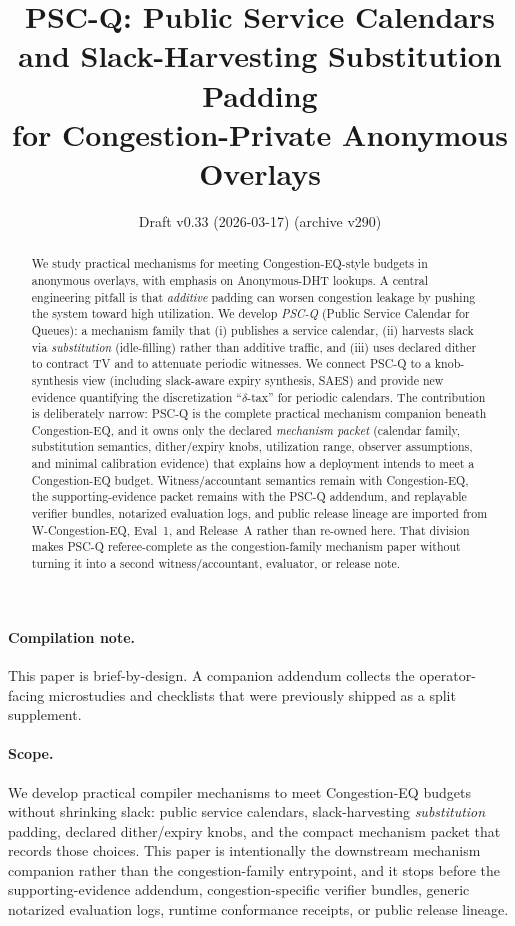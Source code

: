 \documentclass[11pt]{article}
\title{PSC-Q: Public Service Calendars and Slack-Harvesting Substitution Padding \\ for Congestion-Private Anonymous Overlays}
\author{}
\date{Draft v0.33 (2026-03-17) (archive v290)}
\theoremstyle{definition}
\theoremstyle{remark}
\begin{document}
\maketitle

\begin{abstract}
We study practical mechanisms for meeting Congestion-EQ-style budgets in anonymous overlays, with emphasis on Anonymous-DHT lookups.
A central engineering pitfall is that \emph{additive} padding can worsen congestion leakage by pushing the system toward high utilization.
We develop \emph{PSC-Q} (Public Service Calendar for Queues): a mechanism family that (i) publishes a service calendar, (ii) harvests slack via \emph{substitution} (idle-filling) rather than additive traffic, and (iii) uses declared dither to contract TV and to attenuate periodic witnesses.
We connect PSC-Q to a knob-synthesis view (including slack-aware expiry synthesis, SAES) and provide new evidence quantifying the discretization ``$\delta$-tax'' for periodic calendars.
The contribution is deliberately narrow: PSC-Q is the complete practical mechanism companion beneath Congestion-EQ, and it owns only the declared \emph{mechanism packet} (calendar family, substitution semantics, dither/expiry knobs, utilization range, observer assumptions, and minimal calibration evidence) that explains how a deployment intends to meet a Congestion-EQ budget.
Witness/accountant semantics remain with Congestion-EQ, the supporting-evidence packet remains with the PSC-Q addendum, and replayable verifier bundles, notarized evaluation logs, and public release lineage are imported from W-Congestion-EQ, Eval~1, and Release~A rather than re-owned here. That division makes PSC-Q referee-complete as the congestion-family mechanism paper without turning it into a second witness/accountant, evaluator, or release note.
\end{abstract}
\paragraph{Compilation note.}
This paper is brief-by-design. A companion addendum collects the operator-facing microstudies and checklists that were previously shipped as a split supplement.\cite{series:pscqaddendum}

\paragraph{Scope.}
We develop practical compiler mechanisms to meet Congestion-EQ budgets without shrinking slack: public service calendars, slack-harvesting \emph{substitution} padding, declared dither/expiry knobs, and the compact mechanism packet that records those choices.
This paper is intentionally the downstream mechanism companion rather than the congestion-family entrypoint, and it stops before the supporting-evidence addendum, congestion-specific verifier bundles, generic notarized evaluation logs, runtime conformance receipts, or public release lineage.\cite{series:pscqaddendum,series:wcongeq,series:evalnotary,series:opb,anondht_release_receipts}
\end{document}
